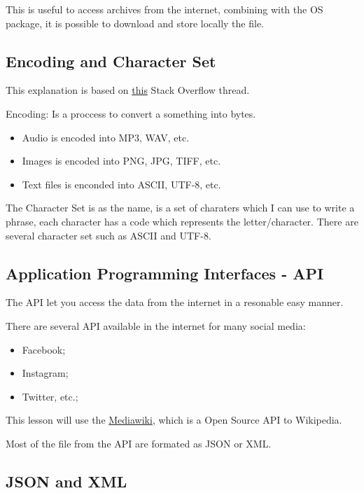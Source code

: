 \documentclass[]{book}
\providecommand{\tightlist}{%
  \setlength{\itemsep}{0pt}\setlength{\parskip}{0pt}}
\begin{document}
This is useful to access archives from the internet, combining with the
OS package, it is possible to download and store locally the file.

\subsection{Encoding and Character
Set}\label{encoding-and-character-set}

This explanation is based on
\href{https://stackoverflow.com/questions/6224052/what-is-the-difference-between-a-string-and-a-byte-string}{this}
Stack Overflow thread.

Encoding: Is a proccess to convert a something into bytes.

\begin{itemize}
\tightlist
\item
  Audio is encoded into MP3, WAV, etc.
\item
  Images is encoded into PNG, JPG, TIFF, etc.
\item
  Text files is enconded into ASCII, UTF-8, etc.
\end{itemize}

The Character Set is as the name, is a set of charaters which I can use
to write a phrase, each character has a code which represents the
letter/character. There are several character set such as ASCII and
UTF-8.

\subsection{Application Programming Interfaces -
API}\label{application-programming-interfaces---api}

The API let you access the data from the internet in a resonable easy
manner.

There are several API available in the internet for many social media:

\begin{itemize}
\tightlist
\item
  Facebook;
\item
  Instagram;
\item
  Twitter, etc.;
\end{itemize}

This lesson will use the
\href{https://www.mediawiki.org/wiki/MediaWiki}{Mediawiki}, which is a
Open Source API to Wikipedia.

Most of the file from the API are formated as JSON or XML.

\subsection{JSON and XML}\label{json-and-xml}
\end{document}
